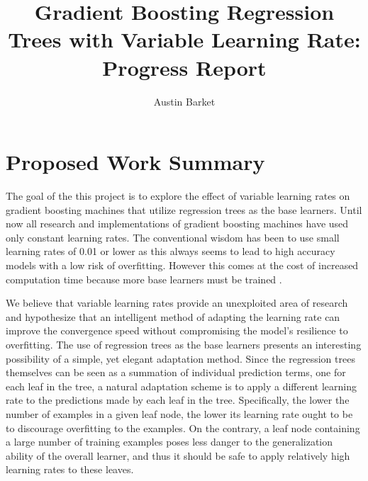 \documentclass[runningheads]{llncs_2}
\begin{document}
\pagestyle{headings}
\mainmatter

\title{Gradient Boosting Regression Trees with Variable Learning Rate: Progress Report}
\titlerunning{}
\author{Austin Barket}
 \maketitle

\section{Proposed Work Summary}



The goal of the this project is to explore the effect of variable learning rates on gradient boosting machines that utilize regression trees as the base learners. Until now all research and implementations of gradient boosting machines have used only constant learning rates. The conventional wisdom has been to use small learning rates of 0.01 or lower as this always seems to lead to high accuracy models with a low risk of overfitting. However this comes at the cost of increased computation time because more base learners must be trained \cite{2012ridgeway}. 

We believe that variable learning rates provide an unexploited area of research and hypothesize that an intelligent method of adapting the learning rate can improve the convergence speed without compromising the model's resilience to overfitting. The use of regression trees as the base learners presents an interesting possibility of a simple, yet elegant adaptation method. Since the regression trees themselves can be seen as a summation of individual prediction terms, one for each leaf in the tree, a natural adaptation scheme is to apply a different learning rate to the predictions made by each leaf in the tree. Specifically, the lower the number of examples in a given leaf node, the lower its learning rate ought to be to discourage overfitting to the examples. On the contrary, a leaf node containing a large number of training examples poses less danger to the generalization ability of the overall learner, and thus it should be safe to apply relatively high learning rates to these leaves. 
\end{document}

